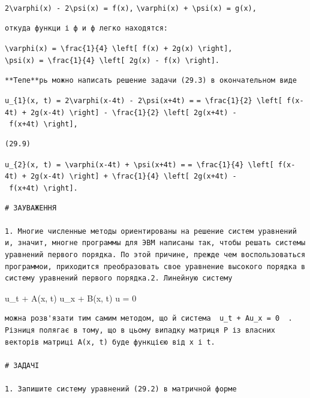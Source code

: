 \documentclass[
  ukrainian,
]{article}
\begin{document}
\texttt{2\textbackslash{}varphi(x)\ -\ 2\textbackslash{}psi(x)\ =\ f(x),}
\texttt{\textbackslash{}varphi(x)\ +\ \textbackslash{}psi(x)\ =\ g(x),}

\begin{verbatim}
откуда функци і ф и ф легко находятся:
\end{verbatim}

\texttt{\textbackslash{}varphi(x)\ =\ \textbackslash{}frac\{1\}\{4\}\ \textbackslash{}left{[}\ f(x)\ +\ 2g(x)\ \textbackslash{}right{]},}
\texttt{\textbackslash{}psi(x)\ =\ \textbackslash{}frac\{1\}\{4\}\ \textbackslash{}left{[}\ 2g(x)\ -\ f(x)\ \textbackslash{}right{]}.}

\begin{verbatim}
**Тепе**рь можно написать решение задачи (29.3) в окончательном виде
\end{verbatim}

\texttt{u\_\{1\}(x,\ t)\ =\ 2\textbackslash{}varphi(x-4t)\ -\ 2\textbackslash{}psi(x+4t)\ =}
\texttt{=\ \textbackslash{}frac\{1\}\{2\}\ \textbackslash{}left{[}\ f(x-4t)\ +\ 2g(x-4t)\ \textbackslash{}right{]}\ -\ \textbackslash{}frac\{1\}\{2\}\ \textbackslash{}left{[}\ 2g(x+4t)\ -\ f(x+4t)\ \textbackslash{}right{]},}

\begin{verbatim}
(29.9)
\end{verbatim}

\texttt{u\_\{2\}(x,\ t)\ =\ \textbackslash{}varphi(x-4t)\ +\ \textbackslash{}psi(x+4t)\ =}
\texttt{=\ \textbackslash{}frac\{1\}\{4\}\ \textbackslash{}left{[}\ f(x-4t)\ +\ 2g(x-4t)\ \textbackslash{}right{]}\ +\ \textbackslash{}frac\{1\}\{4\}\ \textbackslash{}left{[}\ 2g(x+4t)\ -\ f(x+4t)\ \textbackslash{}right{]}.}

\begin{verbatim}
# ЗАУВАЖЕННЯ

1. Многие численные методы ориентированы на решение систем уравнений и, значит, многне программы для ЭВМ написаны так, чтобы решать системы уравнений первого порядка. По этой причине, прежде чем воспользоваться программои, приходится преобразовать свое уравнение высокого порядка в систему уравнений первого порядка.2. Линейную систему
\end{verbatim}

u\_t + A(x, t) u\_x + B(x, t) u = 0

\begin{verbatim}
можна розв'язати тим самим методом, що й система  u_t + Au_x = 0  . Різниця полягає в тому, що в цьому випадку матриця P із власних векторів матриці A(x, t) буде функцією від x і t.

# ЗАДАЧІ

1. Запишите систему уравнений (29.2) в матричной форме
\end{verbatim}
\end{document}
